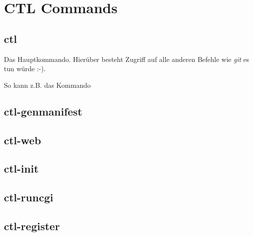 \section{CTL Commands}

\subsection{ctl}
Das Hauptkommando. Hierüber besteht Zugriff auf alle anderen Befehle wie
\emph{git} es tun würde :-).

So kann z.B. das Kommando
\subsection{ctl-genmanifest}
\subsection{ctl-web}
\subsection{ctl-init}
\subsection{ctl-runcgi}
\subsection{ctl-register}
